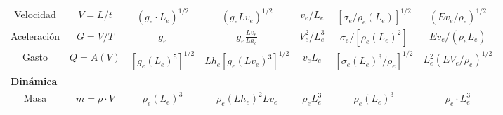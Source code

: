 \begin{table}[h!]
\begin{turn}{90}
\begin{tabular}{@{}ccccccc@{}}
    Velocidad                                                                      & $V=L/t$                       & $\left(g_e\cdot L_e\right)^{1/2}$                                     & $\left(g_eLv_e\right)^{1/2}$                                                         & $v_e/L_e$                                                                         & $\left[\sigma_e/\rho_e\left(L_e\right)\right]^{1/2}$                            & $\left(Ev_e/\rho_e\right)^{1/2}$        \\
    Aceleración                                                                    & $G=V/T$                       & $g_e$                                                                 & $g_e\frac{Lv_e}{Lh_e}$                                                               & $V_e^2/L_e^3$                                                                     & $\sigma_e/\left[\rho_e\left(L_e\right)^2\right]$                                & $Ev_e/\left(\rho_eL_e\right)$           \\
    Gasto                                                                          & $Q=A(V)$                      & $\left[g_e\left(L_e\right)^5\right]^{1/2}$                            & $Lh_e\left[g_e\left(Lv_e\right)^3\right]^{1/2}$                                      & $v_eL_e$                                                                          & $\left[\sigma_e\left(L_e\right)^3/\rho_e\right]^{1/2}$                          & $L_e^2\left(EV_e/\rho_e\right)^{1/2}$   \\
    \multicolumn{1}{l}{\textbf{Dinámica}}                                          &                               &                                                                       &                                                                                      &                                                                                   &                                                                                 &                                         \\
    Masa                                                                           & $m=\rho\cdot V$               & $\rho_e\left(L_e\right)^3$                                            & $\rho_e\left(Lh_e\right)^2Lv_e$                                                      & $\rho_eL_e^3$                                                                     & $\rho_e\left(L_e\right)^3$                                                      & $\rho_e\cdot L_e^3$                     \\

\end{tabular}
\end{turn}
\end{table}
